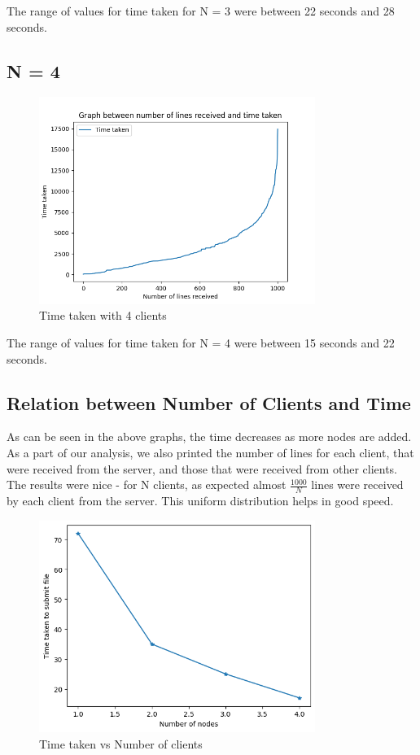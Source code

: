 \documentclass[12pt]{scrartcl}
\begin{document}
The range of values for time taken for N = 3 were between 22 seconds and 28 seconds.

\subsection{N = 4}

\begin{figure}[H]
    \centering
    \includegraphics[width=0.8\textwidth]{images/latency_n_4.png}
    \caption{Time taken with 4 clients}
    \label{fig:my_label}
\end{figure}

The range of values for time taken for N = 4 were between 15 seconds and 22 seconds.

\subsection{Relation between Number of Clients and Time}

As can be seen in the above graphs, the time decreases as more nodes are added. As a part of our analysis, we also printed the number of lines for each client, that were received from the server, and those that were received from other clients. The results were nice - for N clients, as expected almost \(\frac{1000}{N}\) lines were received by each client from the server. This uniform distribution helps in good speed. \\

\begin{figure}[H]
    \centering
    \includegraphics[width=0.8\textwidth]{images/download.png}
    \caption{Time taken vs Number of clients}
    \label{fig:my_label}
\end{figure}
\end{document}
